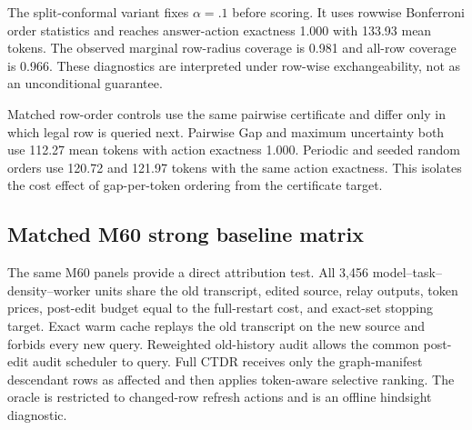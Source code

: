 \documentclass[11pt]{article}
\begin{document}
The split-conformal variant fixes $\alpha=.1$ before scoring. It uses rowwise Bonferroni order statistics and reaches answer-action exactness 1.000 with 133.93 mean tokens. The observed marginal row-radius coverage is 0.981 and all-row coverage is 0.966. These diagnostics are interpreted under row-wise exchangeability, not as an unconditional guarantee.

Matched row-order controls use the same pairwise certificate and differ only in
which legal row is queried next. Pairwise Gap and maximum uncertainty both use
112.27 mean tokens with action exactness 1.000. Periodic and seeded random
orders use 120.72 and 121.97 tokens with the same action exactness. This
isolates the cost effect of gap-per-token ordering from the certificate target.

\begin{table}[t]
\centering\small
{}
\caption{Held-out answer-action replay with per-cell quantile selection. The pooled $q=.9$ selection gives 124.74 mean tokens and is reported in the text. All methods use the same cached transcript, graph mask and row prices.}
\end{table}

\subsection{Matched M60 strong baseline matrix}
The same M60 panels provide a direct attribution test. All 3,456
model--task--density--worker units share the old transcript, edited source,
relay outputs, token prices, post-edit budget equal to the full-restart cost,
and exact-set stopping target. Exact warm cache
replays the old transcript on the new source and forbids every new query.
Reweighted old-history audit allows the common post-edit audit scheduler to
query. Full CTDR receives only the graph-manifest descendant rows as affected
and then applies token-aware selective ranking. The oracle is restricted to changed-row refresh actions and is an offline hindsight diagnostic.
\end{document}
